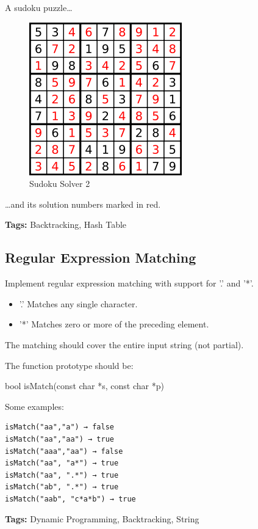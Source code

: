 \documentclass[12pt]{book}
\begin{document}
A sudoku puzzle\ldots{}

\begin{figure}[htb]
\centering
\includegraphics[width=.9\linewidth]{./pic/solveSudoku2.png}
\caption{Sudoku Solver 2}
\end{figure}
\ldots{}and its solution numbers marked in red.

\textbf{Tags:} Backtracking, Hash Table

\subsection{Regular Expression Matching}
\label{sec-16-4-10}
Implement regular expression matching with support for '.' and '*'.
\begin{itemize}
\item '.' Matches any single character.
\item '*' Matches zero or more of the preceding element.
\end{itemize}

The matching should cover the entire input string (not partial).

The function prototype should be:

bool isMatch(const char *s, const char *p)

Some examples:
\lstset{language=java,label= ,caption= ,numbers=none}
\begin{lstlisting}
isMatch("aa","a") → false
isMatch("aa","aa") → true
isMatch("aaa","aa") → false
isMatch("aa", "a*") → true
isMatch("aa", ".*") → true
isMatch("ab", ".*") → true
isMatch("aab", "c*a*b") → true
\end{lstlisting}
\textbf{Tags:} Dynamic Programming, Backtracking, String
\end{document}
